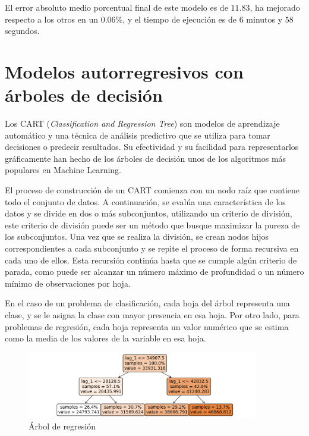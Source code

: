 \documentclass[12pt,twoside]{article}
\begin{document}
El error absoluto medio porcentual final de este modelo es de $11.83$, ha mejorado respecto a los otros en un $0.06\%$, y el tiempo de ejecución es de $6$ minutos y $58$ segundos.

















\newpage
\section{Modelos autorregresivos con árboles de decisión}
Los CART (\emph{Classification and Regression Tree}) \cite{DT1} son modelos de aprendizaje automático y una técnica de análisis predictivo que se utiliza para tomar decisiones o predecir resultados. Su efectividad y su facilidad para representarlos gráficamente han hecho de los árboles de decisión unos de los algoritmos más populares en Machine Learning.

El proceso de construcción de un CART comienza con un nodo raíz que contiene todo el conjunto de datos. A continuación, se evalúa una característica de los datos y se divide en dos o más subconjuntos, utilizando un criterio de división, este criterio de división puede ser un método que busque maximizar la pureza de los subconjuntos. Una vez que se realiza la división, se crean nodos hijos correspondientes a cada subconjunto y se repite el proceso de forma recursiva en cada uno de ellos. Esta recursión continúa hasta que se cumple algún criterio de parada, como puede ser alcanzar un número máximo de profundidad o un número mínimo de observaciones por hoja.

En el caso de un problema de clasificación, cada hoja del árbol representa una clase, y se le asigna la clase con mayor presencia en esa hoja. Por otro lado, para problemas de regresión, cada hoja representa un valor numérico que se estima como la media de los valores de la variable en esa hoja.


\begin{figure}[h]
\centering
    \includegraphics[width = 0.9\textwidth]{imagenes/reg_tree.png}
    \caption{Árbol de regresión}\label{fig:reg_tree}
\end{figure}
\end{document}
